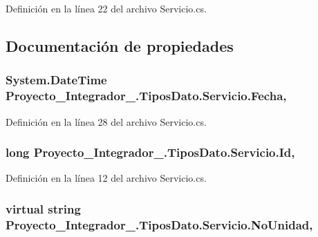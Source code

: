 Definición en la línea 22 del archivo Servicio.\-cs.



\subsection{Documentación de propiedades}
\hypertarget{class_proyecto___integrador__3_1_1_tipos_dato_1_1_servicio_adfd9654485b999c795437dee578fac98}{
\subsubsection[{Fecha}]{\setlength{\rightskip}{0pt plus 5cm}System.\-Date\-Time Proyecto\-\_\-\-Integrador\-\_.\-Tipos\-Dato.\-Servicio.\-Fecha\hspace{0.3cm}{\ttfamily [get]}, {\ttfamily [set]}}}\label{class_proyecto___integrador__3_1_1_tipos_dato_1_1_servicio_adfd9654485b999c795437dee578fac98}


Definición en la línea 28 del archivo Servicio.\-cs.

\hypertarget{class_proyecto___integrador__3_1_1_tipos_dato_1_1_servicio_a81c451c62cc6b77b6f80614df5ffb80d}{
\subsubsection[{Id}]{\setlength{\rightskip}{0pt plus 5cm}long Proyecto\-\_\-\-Integrador\-\_.\-Tipos\-Dato.\-Servicio.\-Id\hspace{0.3cm}{\ttfamily [get]}, {\ttfamily [set]}}}\label{class_proyecto___integrador__3_1_1_tipos_dato_1_1_servicio_a81c451c62cc6b77b6f80614df5ffb80d}


Definición en la línea 12 del archivo Servicio.\-cs.

\hypertarget{class_proyecto___integrador__3_1_1_tipos_dato_1_1_servicio_abb92d5f6f972c2df3a7cbe4d25b713e8}{
\subsubsection[{No\-Unidad}]{\setlength{\rightskip}{0pt plus 5cm}virtual string Proyecto\-\_\-\-Integrador\-\_.\-Tipos\-Dato.\-Servicio.\-No\-Unidad\hspace{0.3cm}{\ttfamily [get]}, {\ttfamily [set]}}}\label{class_proyecto___integrador__3_1_1_tipos_dato_1_1_servicio_abb92d5f6f972c2df3a7cbe4d25b713e8}


